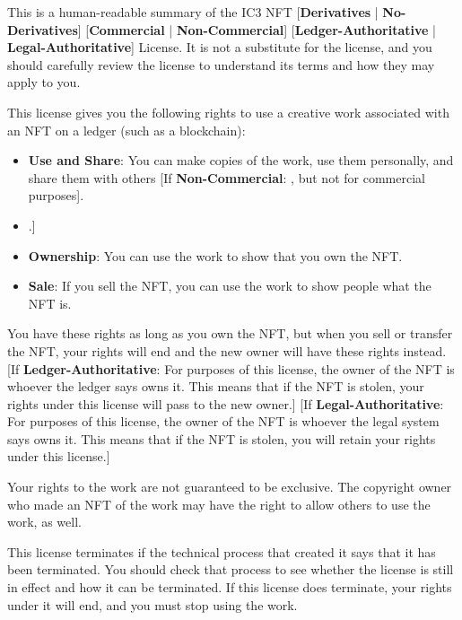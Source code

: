 \documentclass{article}
\newcommand{\keyword}[1]{\textbf{#1}\xspace}
\newcommand{\commercial}{\keyword{Commercial}}
\newcommand{\noncommercial}{\keyword{Non-Commercial}}
\newcommand{\noderivative}{\keyword{No-Derivatives}}
\newcommand{\derivative}{\keyword{Derivatives}}
\newcommand{\sharealike}{\keyword{Share-Alike}}
\newcommand{\derivativetracking}{\keyword{Derivative-Tracking}}
\newcommand{\ledger}{\keyword{Ledger-Authoritative}}
\newcommand{\legal}{\keyword{Legal-Authoritative}}
\newcommand{\iflicenseoption}[2]{[\colorbox{light-gray}{If #1:} #2]}
\newcommand{\ifnotlicenseoption}[2]{[\colorbox{light-gray}{Unless #1:} #2]}
\begin{document}
This is a human-readable summary of the IC3 NFT [\derivative{} | \noderivative{}] [\commercial{} | \noncommercial{}] [\ledger{} | \legal{}] License. It is not a substitute for the license, and you should carefully review the license to understand its terms and how they may apply to you.

This license gives you the following rights to use a creative work associated with an NFT on a ledger (such as a blockchain): 

\begin{itemize}
\item \textbf{Use and Share}: You can make copies of the work, use them personally, and share them with others \iflicenseoption{\noncommercial}{, but not for commercial purposes}.
\item \ifnotlicenseoption{\noderivative}{\textbf{Derivatives}: you can make new works that include and build on the work, use them, and share them with others \iflicenseoption{\noncommercial}{, but not for commercial purposes} \iflicenseoption{\derivativetracking}{, provided that you also release them as NFTs} \iflicenseoption{\sharealike}{, provided that you also release them as NFTs under the same license}.}
\item \textbf{Ownership}: You can use the work to show that you own the NFT.
\item \textbf{Sale}: If you sell the NFT, you can use the work to show people what the NFT is.
\end{itemize}

You have these rights as long as you own the NFT, but when you sell or transfer the NFT, your rights will end and the new owner will have these rights instead. \iflicenseoption{\ledger}{For purposes of this license, the owner of the NFT is whoever the ledger says owns it. This means that if the NFT is stolen, your rights under this license will pass to the new owner.} \iflicenseoption{\legal}{For purposes of this license, the owner of the NFT is whoever the legal system says owns it. This means that if the NFT is stolen, you will retain your rights under this license.}

Your rights to the work are not guaranteed to be exclusive. The copyright owner who made an NFT of the work may have the right to allow others to use the work, as well.

This license terminates if the technical process that created it says that it has been terminated. You should check that process to see whether the license is still in effect and how it can be terminated. If this license does terminate, your rights under it will end, and you must stop using the work.
\end{document}
